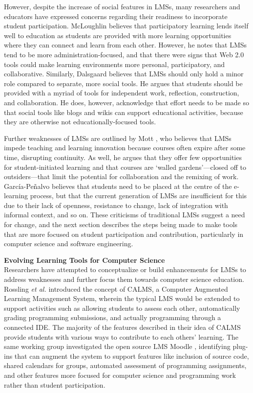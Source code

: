 However, despite the increase of social features in LMSs, many researchers and educators have expressed concerns regarding their readiness to incorporate student participation. McLoughlin \cite{mcloughlin2007social} believes that participatory learning lends itself well to education as students are provided with more learning opportunities where they can connect and learn from each other. However, he notes that LMSs tend to be more administration-focused, and that there were signs that Web 2.0 tools could make learning environments more personal, participatory, and collaborative. Similarly, Dalsgaard \cite{dalsgaard2006social} believes that LMSs should only hold a minor role compared to separate, more social tools. He argues that students should be provided with a myriad of tools for independent work, reflection, construction, and collaboration. He does, however, acknowledge that effort needs to be made so that social tools like blogs and wikis can support educational activities, because they are otherwise not educationally-focused tools.

Further weaknesses of LMSs are outlined by Mott \cite{mott2010envisioning}, who believes that LMSs impede teaching and learning innovation because courses often expire after some time, disrupting continuity. As well, he argues that they offer few opportunities for student-initiated learning and that courses are `walled gardens'---closed off to outsiders---that limit the potential for collaboration and the remixing of work. García-Peñalvo \cite{garcia2011opening} believes that students need to be placed at the centre of the e-learning process, but that the current generation of LMSs are insufficient for this due to their lack of openness, resistance to change, lack of integration with informal context, and so on. These criticisms of traditional LMSs suggest a need for change, and the next section describes the steps being made to make tools that are more focused on student participation and contribution, particularly in computer science and software engineering.

\textbf{Evolving Learning Tools for Computer Science} \\

Researchers have attempted to conceptualize or build enhancements for LMSs to address weaknesses and further focus them towards computer science education. Rossling \textit{et al.} \cite{rossling2008enhancing} introduced the concept of CALMS, a Computer Augmented Learning Management System, wherein the typical LMS would be extended to support activities such as allowing students to assess each other, automatically grading programming submissions, and actually programming through a connected IDE. The majority of the features described in their idea of CALMS provide students with various ways to contribute to each others' learning. The same working group investigated the open source LMS Moodle \cite{rossling2010adapting}, identifying plug-ins that can augment the system to support features like inclusion of source code, shared calendars for groups, automated assessment of programming assignments, and other features more focused for computer science and programming work rather than student participation.

